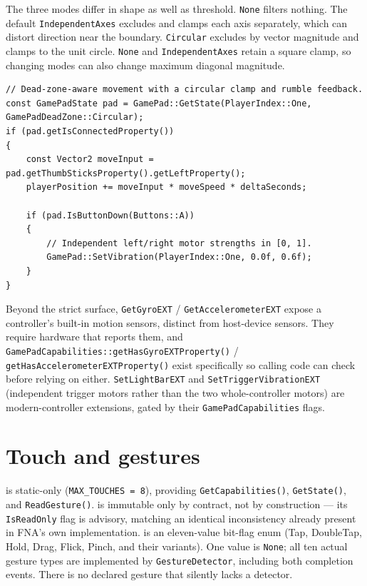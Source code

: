 The three  modes differ in shape as well as threshold.
\texttt{None} filters nothing. The default \texttt{IndependentAxes} excludes and clamps each
axis separately, which can distort direction near the boundary. \texttt{Circular} excludes by
vector magnitude and clamps to the unit circle. \texttt{None} and \texttt{IndependentAxes}
retain a square clamp, so changing modes can also change maximum diagonal magnitude.

\begin{lstlisting}
// Dead-zone-aware movement with a circular clamp and rumble feedback.
const GamePadState pad = GamePad::GetState(PlayerIndex::One, GamePadDeadZone::Circular);
if (pad.getIsConnectedProperty())
{
    const Vector2 moveInput = pad.getThumbSticksProperty().getLeftProperty();
    playerPosition += moveInput * moveSpeed * deltaSeconds;

    if (pad.IsButtonDown(Buttons::A))
    {
        // Independent left/right motor strengths in [0, 1].
        GamePad::SetVibration(PlayerIndex::One, 0.0f, 0.6f);
    }
}
\end{lstlisting}

Beyond the strict surface, \texttt{GetGyroEXT} / \texttt{GetAccelerometerEXT} expose a
controller's built-in motion sensors, distinct from host-device sensors. They require hardware
that reports them, and
\texttt{GamePadCapabilities::getHasGyroEXTProperty()} / \texttt{getHasAccelerometerEXTProperty()}
exist specifically so calling code can check before relying on either. \texttt{SetLightBarEXT}
and \texttt{SetTriggerVibrationEXT} (independent trigger motors rather than the two
whole-controller motors) are modern-controller extensions, gated by their
\texttt{GamePadCapabilities} flags.

\section{Touch and gestures}

 is static-only (\texttt{MAX\_TOUCHES = 8}), providing
\texttt{GetCapabilities()}, \texttt{GetState()}, and \texttt{ReadGesture()}.
 is immutable only by contract, not by construction --- its
\texttt{IsReadOnly} flag is advisory, matching an identical inconsistency already present in
FNA's own implementation.  is an eleven-value bit-flag enum (Tap,
DoubleTap, Hold, Drag, Flick, Pinch, and their variants).
One value is \texttt{None}; all ten actual gesture types are implemented by
\texttt{GestureDetector}, including both completion events. There is no declared gesture that
silently lacks a detector.

